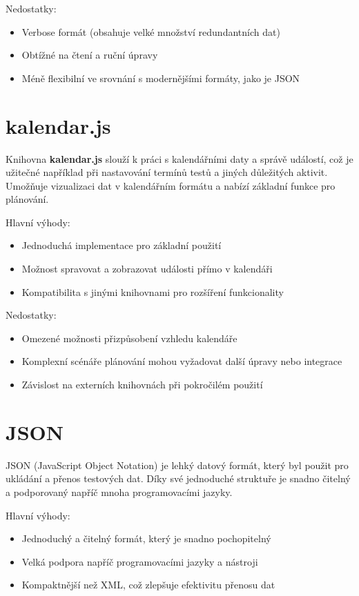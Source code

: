 \documentclass[12pt, a4paper, twoside, openright]{report}
\begin{document}
Nedostatky: 
\begin{itemize}
    \item Verbose formát (obsahuje velké množství redundantních dat)
    \item Obtížné na čtení a ruční úpravy
    \item Méně flexibilní ve srovnání s modernějšími formáty, jako je JSON
\end{itemize}

\section{kalendar.js}
Knihovna \textbf{kalendar.js} slouží k práci s kalendářními daty a správě událostí, což je užitečné například při nastavování termínů testů a jiných důležitých aktivit. Umožňuje vizualizaci dat v kalendářním formátu a nabízí základní funkce pro plánování.

Hlavní výhody: 
\begin{itemize}
    \item Jednoduchá implementace pro základní použití
    \item Možnost spravovat a zobrazovat události přímo v kalendáři
    \item Kompatibilita s jinými knihovnami pro rozšíření funkcionality
\end{itemize}

Nedostatky: 
\begin{itemize}
    \item Omezené možnosti přizpůsobení vzhledu kalendáře
    \item Komplexní scénáře plánování mohou vyžadovat další úpravy nebo integrace
    \item Závislost na externích knihovnách při pokročilém použití
\end{itemize}

\section{JSON}
JSON (JavaScript Object Notation) je lehký datový formát, který byl použit pro ukládání a přenos testových dat. Díky své jednoduché struktuře je snadno čitelný a podporovaný napříč mnoha programovacími jazyky.

Hlavní výhody: 
\begin{itemize}
    \item Jednoduchý a čitelný formát, který je snadno pochopitelný
    \item Velká podpora napříč programovacími jazyky a nástroji
    \item Kompaktnější než XML, což zlepšuje efektivitu přenosu dat
\end{itemize}
\end{document}
